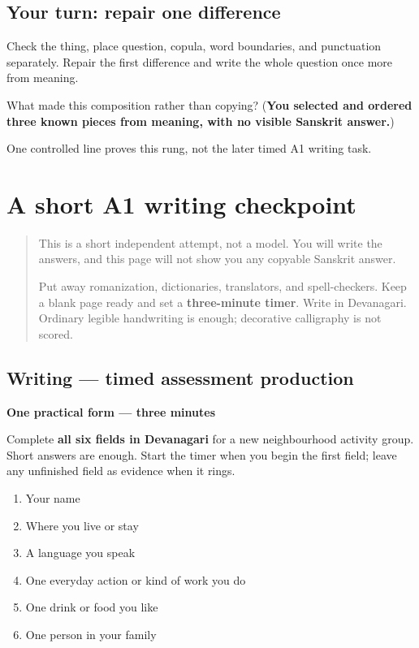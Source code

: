 \subsection*{Your turn: repair one difference}
Check the thing, place question, copula, word boundaries, and punctuation separately. Repair the first difference and write the whole question once more from meaning.

\begin{tcolorbox}[breakable,colback=teal!4,colframe=teal!35!black,title={Before you move on}]
What made this composition rather than copying? (\textbf{You selected and ordered three known pieces from meaning, with no visible Sanskrit answer.})

One controlled line proves this rung, not the later timed A1 writing task.
\end{tcolorbox}
\section[(short timed A1 writing checkpoint)]{A short A1 writing checkpoint}

\label{lesson:SA-W65-a1-timed-production}



\begin{quote}
This is a short independent attempt, not a model. You will write the answers, and this page will not show you any copyable Sanskrit answer.

Put away romanization, dictionaries, translators, and spell-checkers. Keep a blank page ready and set a \textbf{three-minute timer}. Write in Devanagari. Ordinary legible handwriting is enough; decorative calligraphy is not scored.
\end{quote}

\subsection*{Writing — timed assessment production}
\textbf{One practical form — three minutes}

Complete \textbf{all six fields in Devanagari} for a new neighbourhood activity group. Short answers are enough. Start the timer when you begin the first field; leave any unfinished field as evidence when it rings.

\begin{enumerate}
\raggedright
  \item Your name
  \item Where you live or stay
  \item A language you speak
  \item One everyday action or kind of work you do
  \item One drink or food you like
  \item One person in your family
\end{enumerate}

